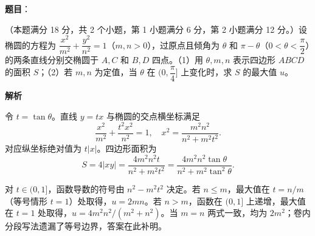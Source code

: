 \begin{answer}

\textbf{题目}：

（本题满分 18 分，共 2 个小题，第 1 小题满分 6 分，第 2 小题满分 12 分。）设椭圆的方程为 $\dfrac{x^2}{m^2}+\dfrac{y^2}{n^2}=1$（$m,n>0$），过原点且倾角为 $\theta$ 和 $\pi-\theta$（$0<\theta<\dfrac\pi2$）的两条直线分别交椭圆于 $A,C$ 和 $B,D$ 四点。（1）用 $\theta,m,n$ 表示四边形 $ABCD$ 的面积 $S$；（2）若 $m,n$ 为定值，当 $\theta$ 在 $(0,\dfrac\pi4]$ 上变化时，求 $S$ 的最大值 $u$。

\textbf{解析}

令 $t=\tan\theta$。直线 $y=tx$ 与椭圆的交点横坐标满足
\nopagebreak[4]
\[
\frac{x^2}{m^2}+\frac{t^2x^2}{n^2}=1,
\quad x^2=\frac{m^2n^2}{n^2+m^2t^2}.
\]
对应纵坐标绝对值为 $t|x|$。四边形面积为
\nopagebreak[4]
\[
S=4|xy|=\frac{4m^2n^2t}{n^2+m^2t^2}
=\frac{4m^2n^2\tan\theta}{n^2+m^2\tan^2\theta}.
\]

对 $t\in(0,1]$，函数导数的符号由 $n^2-m^2t^2$ 决定。若 $n\le m$，最大值在 $t=n/m$（等号情形 $t=1$）处取得，$u=2mn$。若 $n>m$，函数在 $(0,1]$ 上递增，最大值在 $t=1$ 处取得，$u=4m^2n^2/(m^2+n^2)$。当 $m=n$ 两式一致，均为 $2m^2$；卷内分段写法遗漏了等号边界，答案在此补明。


\end{answer}
